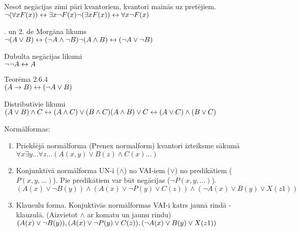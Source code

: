 \documentclass[12pt]{article}
\begin{document}
\noindent
Nesot negācijas zīmi pāri kvantoriem, kvantori mainās uz pretējiem.\\
$\neg(\forall x F(x)) \leftrightarrow \exists x\neg F(x)\\
\neg(\exists x F(x)) \leftrightarrow \forall x\neg F(x)\\
$

. un 2. de Morgāna likums\\
$\neg(A \lor B) \leftrightarrow (\neg A \land \neg B)\\
\neg(A \land B) \leftrightarrow (\neg A \lor \neg B)\\
$

\noindent
Dubulta negācijas likumi\\
$\neg\neg A \leftrightarrow A\\
$

\noindent
Teorēma 2.6.4\\
$(A \rightarrow B ) \leftrightarrow (\neg A \lor B )\\
$

\noindent
Distributīvie likumi\\
$(A \lor B) \land C \leftrightarrow (A \land C) \lor (B \land C) \\
(A \land B) \lor C \leftrightarrow (A \lor C) \land (B \lor C) \\
$

Normālformas:
\begin{enumerate}
\item
Priekšējā normālforma (Prenex normalform) kvantori izteiksme sākumā
 $\forall x \exists y ... \forall z  ... (A(x,y)\lor B(z) \land C(x) ...)$
\item
Konjunktīvā normālforma UN-i ($\land$) no VAI-iem ($\lor$) no predikātiem ($P(x,y, ...)$). Pie predikātiem var būt negācijas ($\neg P(x,y, ...)$).\\
$(A(x)\lor \neg B(y))\land (A(x)\lor \neg P(y) \lor C(z)) \land (\neg A(x)\lor B(y) \lor X(z1))$
\item
Klausulu forma. Konjuktīvās normālformas VAI-i katrs jaunā rindā - klauzulā. (Aizvietot $\land$ ar komatu un jaunu rindu)\\
$(A(x)\lor \neg B(y)),\\
 (A(x)\lor \neg P(y) \lor C(z)),\\
 (\neg A(x)\lor B(y) \lor X(z1))$
\end{enumerate}
\end{document}
